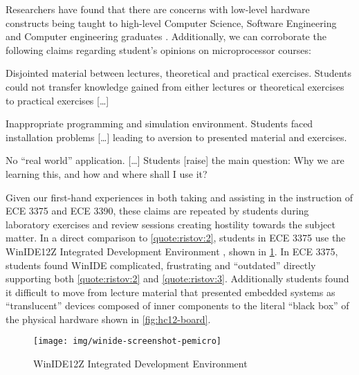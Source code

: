 Researchers have found that there are concerns with low-level hardware constructs being taught to high-level Computer Science, Software Engineering and Computer engineering graduates \cite{Ristov2011, Stolikj2011}. Additionally, we can corroborate the following claims regarding student's opinions on microprocessor courses: 
\begin{displayquote}
    \begin{observations}
        \item Disjointed material between lectures, theoretical and practical
        exercises. Students could not transfer knowledge gained from either lectures or theoretical exercises to practical exercises [\dots] 
            \label{quote:ristov:1}
        \item Inappropriate programming and simulation environment. Students faced installation problems [\dots] leading to aversion to presented material and exercises.
            \label{quote:ristov:2}
        \item No ``real world'' application. [\dots] Students [raise] the main question: Why we are learning this, and how and where shall I use it?
            \label{quote:ristov:3}
    \end{observations}
\end{displayquote}
Given our first-hand experiences in both taking and assisting in the instruction of ECE 3375 and ECE 3390, these claims are repeated by students during laboratory exercises and review sessions creating hostility towards the subject matter. In a direct comparison to \cref{quote:ristov:2}, students in ECE 3375 use the WinIDE12Z Integrated Development Environment \cite{winide}, shown in \cref{fig:winide-screenshot-pemicro}. In ECE 3375, students found WinIDE complicated, frustrating and ``outdated'' \cite{evals:ece3375-2013, evals:ece3375-2014} directly supporting both \cref{quote:ristov:2} and \cref{quote:ristov:3}. Additionally students found it difficult to move from lecture material that presented embedded systems as ``translucent'' devices composed of inner components to the literal ``black box'' of the physical hardware shown in \cref{fig:hc12-board}. 

\begin{figure}[!ht]
    \centering
    \texttt{[image: img/winide-screenshot-pemicro]}
    \caption{WinIDE12Z Integrated Development Environment \cite{winide-screenshot}}
    \label{fig:winide-screenshot-pemicro}
\end{figure}

